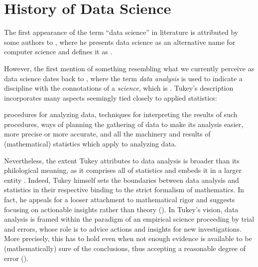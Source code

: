 \section{History of Data Science}
\label{chap:historyDS}

The first appearance of the term ``data science” in literature is attributed by some authors 
to , where he presents data science as an alternative name for computer science and defines it as .


However, the first mention of something resembling what we currently perceive as data science dates back to , where the term \emph{data analysis} is used to indicate a discipline with the connotations of a \emph{science}, which is . 
Tukey's description incorporates many aspects seemingly tied closely to applied statistics: 
\begin{displayquote}
procedures for analyzing data, techniques for interpreting the results of such procedures, ways of planning the gathering of data to make its analysis easier, more precise or more accurate, and all the machinery and results of (mathematical) statistics which apply to analyzing data.
\end{displayquote}
Nevertheless, the extent Tukey attributes to data analysis is broader than its philological meaning, as it comprises all of statistics and embeds it in a larger entity \cite{huber2012data, donoho201750years}.
Indeed, Tukey himself sets the boundaries between data analysis and statistics in their respective binding to the strict formalism of mathematics.
In fact, he appeals for a looser attachment to mathematical rigor and suggests focusing on actionable insights rather than theory ().
In Tukey's vision, data analysis is framed within the paradigm of an empirical science proceeding by trial and errors, whose role is to advice actions and insights for new investigations.
More precisely, this has to hold even when not enough evidence is available to be (mathematically) sure of the conclusions, thus accepting a reasonable degree of error ().
